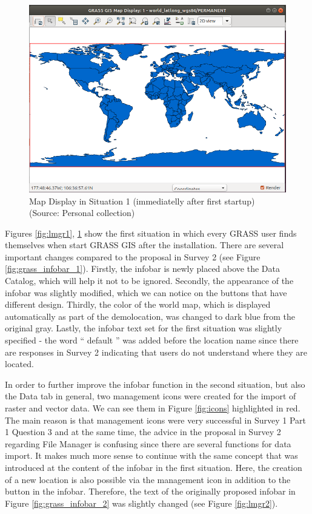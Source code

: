 \documentclass[a4paper,10pt,twoside]{article}
\begin{document}
\vspace{0.3cm}
\begin{figure}[hbt!] 
\begin{center}
\includegraphics[width=14cm]{../pictures/mapdisplay1.png} 
\caption[Map Display in Situation 1 (immediatelly after first startup)]{Map Display in Situation 1 (immediatelly after first startup) (Source: Personal collection)}
\label{fig:mapdisplay1}
\end{center}
\end{figure}

\noindent Figures \ref{fig:lmgr1}, \ref{fig:mapdisplay1} show the
first situation in which every GRASS user finds themselves when start
GRASS GIS after the installation. There are several important changes
compared to the proposal in Survey 2 (see Figure
\ref{fig:grass_infobar_1}). Firstly, the infobar is newly placed
above the Data Catalog, which will help it not to be
ignored. Secondly, the appearance of the infobar was slightly
modified, which we can notice on the buttons that have different
design. Thirdly, the color of the world map, which is displayed
automatically as part of the demolocation, was changed to dark blue
from the original gray. Lastly, the infobar text set for the first
situation was slightly specified - the word `` default '' was added
before the location name since there are responses in Survey 2
indicating that users do not understand where they are located.

In order to further improve the infobar function in the second situation, 
but also the Data tab in general, two management icons were
created for the import of raster and vector data. We can see them in
Figure \ref{fig:icons} highlighted in red. The main reason is that
management icons were very successful in Survey 1 Part 1 Question 3
and at the same time, the advice in the proposal in Survey 2 regarding
File Manager is confusing since there are several functions for data
import. It makes much more sense to continue with the same concept 
that was introduced at the content of the infobar in the first situation. 
Here, the creation of a new location is also possible
via the management icon in addition to the button in the infobar.
Therefore, the text of the originally proposed infobar in Figure
\ref{fig:grass_infobar_2} was slightly changed (see Figure
\ref{fig:lmgr2}).
\end{document}
